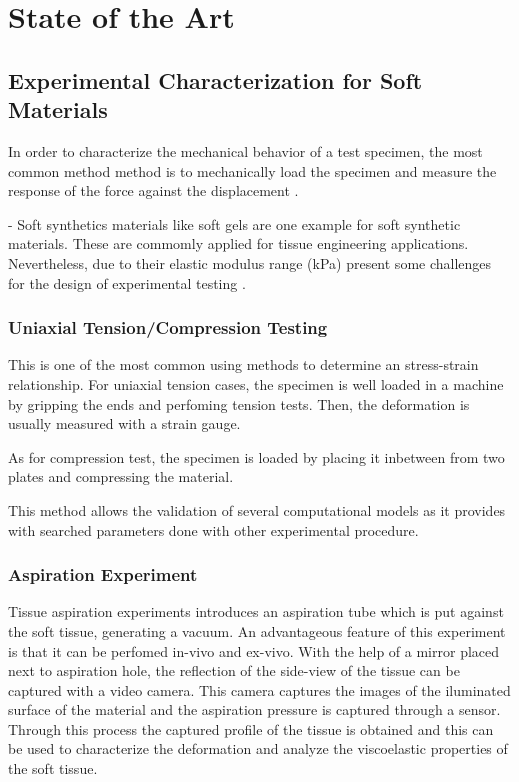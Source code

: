 \section{State of the Art}

\subsection{Experimental Characterization for Soft Materials}
In order to characterize the mechanical behavior of a test specimen, the most common method
method is to mechanically load the specimen and measure the response of the force against 
the displacement \cite{Bergström2015}. 



- Soft synthetics materials like soft gels are one example for soft synthetic materials. These
are commomly applied for tissue engineering applications. Nevertheless, due to their elastic 
modulus range (kPa) present some challenges for the design of experimental testing \cite{Liu2009}.

\subsubsection*{Uniaxial Tension/Compression Testing}

This is one of the most common using methods to determine an stress-strain relationship.
For uniaxial tension cases, the specimen is well loaded in a machine by gripping the ends and perfoming 
tension tests. Then, the deformation is usually measured with a strain gauge. \cite{Bergström2015}

As for compression test, the specimen is loaded by placing it inbetween from two plates 
and compressing the material. \cite{Bergström2015}

This method allows the validation of several computational models as it provides with
 searched parameters done with other experimental procedure. 



\subsubsection*{Aspiration Experiment}

Tissue aspiration experiments introduces an aspiration tube which is put against the 
soft tissue, generating a vacuum. An advantageous feature of this experiment is that 
it can be perfomed in-vivo and ex-vivo.
With the help of a mirror placed next to aspiration 
hole, the reflection of the side-view of the tissue can be captured with a video camera.
This camera captures the images of the iluminated surface of the material and the 
aspiration pressure is captured through a sensor. Through this process the captured 
profile of the tissue is obtained and this can be used to characterize the deformation 
and analyze the viscoelastic properties of the soft tissue\cite{Kauer2002}.

